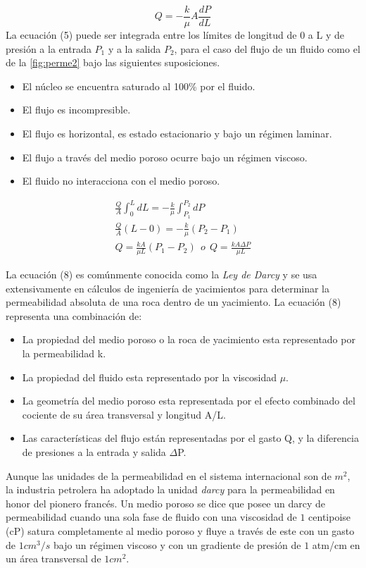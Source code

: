 \begin{equation}
    Q=-\frac{k}{\mu}A\frac{dP}{dL}
\end{equation}
La ecuación (5) puede ser integrada entre los límites de longitud de $0$ a L y de presión a la entrada $P_{1}$ y a la salida $P_{2}$, para el caso del flujo de un fluido como el de la \autoref{fig:perme2} bajo las siguientes suposiciones.

\begin{itemize}
    \item El núcleo se encuentra saturado al 100\% por el fluido.
    \item El flujo es incompresible.
    \item El flujo es horizontal, es estado estacionario y bajo un régimen laminar.
    \item El flujo a través del medio poroso ocurre bajo un régimen viscoso.
    \item El fluido no interacciona con el medio poroso.
\end{itemize}

\begin{gather}
\frac{Q}{A}\int_{0}^{L}dL=-\frac{k}{\mu}\int_{P_{1}}^{P_{2}}dP \\[10pt]
\frac{Q}{A}(L-0) = -\frac{k}{\mu}(P_{2}-P_{1})\\[10pt]
Q=\frac{kA}{\mu L}(P_{1}-P_{2})~~o~~Q=\frac{kA\Delta P}{\mu L}
\end{gather}

La ecuación (8) es comúnmente conocida como la \emph{Ley de Darcy} y se usa extensivamente en cálculos de ingeniería de yacimientos para determinar la permeabilidad absoluta de una roca dentro de un yacimiento. La ecuación (8) representa una combinación de:

\begin{itemize}
    \item La propiedad del medio poroso o la roca de yacimiento esta representado por la permeabilidad k.
    \item La propiedad del fluido esta representado por la viscosidad $\mu$.
    \item La geometría del medio poroso esta representada por el efecto combinado del cociente de su área transversal y longitud A/L.
    \item Las características del flujo están representadas por el gasto Q, y la diferencia de presiones a la entrada y salida $\Delta$P.
\end{itemize}

Aunque las unidades de la permeabilidad en el sistema internacional son de $m^{2}$, la industria petrolera ha adoptado la unidad \emph{darcy} para la permeabilidad en honor del pionero francés. Un medio poroso se dice que posee un darcy de permeabilidad cuando una sola fase de fluido con una viscosidad de $1$ centipoise (cP) satura completamente al medio poroso y fluye a través de este con un gasto de $1cm^{3}/s$ bajo un régimen viscoso y con un gradiente de presión de $1$ atm/cm  en un área transversal de $1cm^{2}$.


